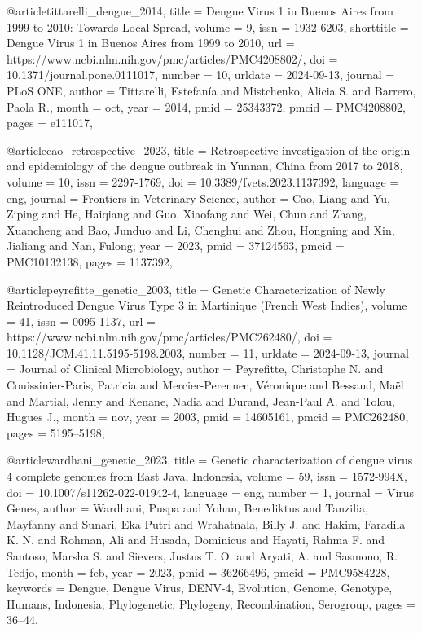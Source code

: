 \documentclass[german,version-2022-01]{uzl-thesis}
\begin{document}
\begin{bibtex-entries}
@article{tittarelli_dengue_2014,
	title = {Dengue {Virus} 1 in {Buenos} {Aires} from 1999 to 2010: {Towards} {Local} {Spread}},
	volume = {9},
	issn = {1932-6203},
	shorttitle = {Dengue {Virus} 1 in {Buenos} {Aires} from 1999 to 2010},
	url = {https://www.ncbi.nlm.nih.gov/pmc/articles/PMC4208802/},
	doi = {10.1371/journal.pone.0111017},
	number = {10},
	urldate = {2024-09-13},
	journal = {PLoS ONE},
	author = {Tittarelli, Estefan\'{i}a and Mistchenko, Alicia S. and Barrero, Paola R.},
	month = oct,
	year = {2014},
	pmid = {25343372},
	pmcid = {PMC4208802},
	pages = {e111017},
}

@article{cao_retrospective_2023,
	title = {Retrospective investigation of the origin and epidemiology of the dengue outbreak in {Yunnan}, {China} from 2017 to 2018},
	volume = {10},
	issn = {2297-1769},
	doi = {10.3389/fvets.2023.1137392},
	language = {eng},
	journal = {Frontiers in Veterinary Science},
	author = {Cao, Liang and Yu, Ziping and He, Haiqiang and Guo, Xiaofang and Wei, Chun and Zhang, Xuancheng and Bao, Junduo and Li, Chenghui and Zhou, Hongning and Xin, Jialiang and Nan, Fulong},
	year = {2023},
	pmid = {37124563},
	pmcid = {PMC10132138},
	pages = {1137392},
}

@article{peyrefitte_genetic_2003,
	title = {Genetic {Characterization} of {Newly} {Reintroduced} {Dengue} {Virus} {Type} 3 in {Martinique} ({French} {West} {Indies})},
	volume = {41},
	issn = {0095-1137},
	url = {https://www.ncbi.nlm.nih.gov/pmc/articles/PMC262480/},
	doi = {10.1128/JCM.41.11.5195-5198.2003},
	number = {11},
	urldate = {2024-09-13},
	journal = {Journal of Clinical Microbiology},
	author = {Peyrefitte, Christophe N. and Couissinier-Paris, Patricia and Mercier-Perennec, V\'{e}ronique and Bessaud, Ma\"{e}l and Martial, Jenny and Kenane, Nadia and Durand, Jean-Paul A. and Tolou, Hugues J.},
	month = nov,
	year = {2003},
	pmid = {14605161},
	pmcid = {PMC262480},
	pages = {5195--5198},
}

@article{wardhani_genetic_2023,
	title = {Genetic characterization of dengue virus 4 complete genomes from {East} {Java}, {Indonesia}},
	volume = {59},
	issn = {1572-994X},
	doi = {10.1007/s11262-022-01942-4},
	language = {eng},
	number = {1},
	journal = {Virus Genes},
	author = {Wardhani, Puspa and Yohan, Benediktus and Tanzilia, Mayfanny and Sunari, Eka Putri and Wrahatnala, Billy J. and Hakim, Faradila K. N. and Rohman, Ali and Husada, Dominicus and Hayati, Rahma F. and Santoso, Marsha S. and Sievers, Justus T. O. and Aryati, A. and Sasmono, R. Tedjo},
	month = feb,
	year = {2023},
	pmid = {36266496},
	pmcid = {PMC9584228},
	keywords = {Dengue, Dengue Virus, DENV-4, Evolution, Genome, Genotype, Humans, Indonesia, Phylogenetic, Phylogeny, Recombination, Serogroup},
	pages = {36--44},
}



\end{bibtex-entries}
\end{document}
